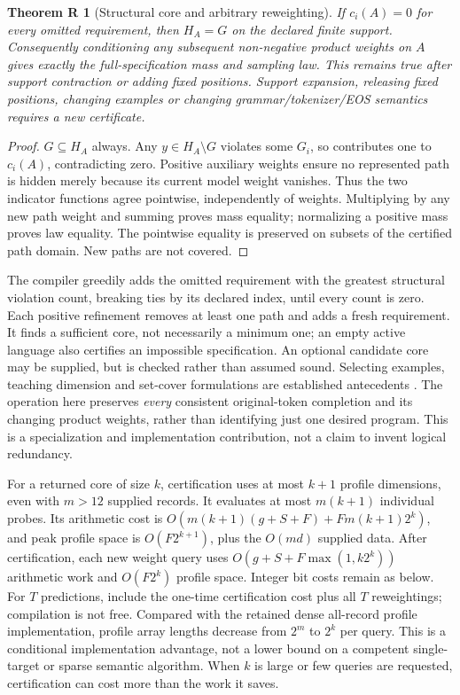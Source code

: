 \documentclass[11pt,a4paper]{article}
\newtheorem{refinement}{Theorem R}
\begin{document}
\begin{refinement}[Structural core and arbitrary reweighting]
If $c_i(A)=0$ for every omitted requirement, then $H_A=G$ on the declared
finite support. Consequently conditioning any subsequent non-negative product
weights on $A$ gives exactly the full-specification mass and sampling law.
This remains true after support contraction or adding fixed positions.
Support expansion, releasing fixed positions, changing examples or changing
grammar/tokenizer/EOS semantics requires a new certificate.
\end{refinement}
\begin{proof}
$G\subseteq H_A$ always. Any $y\in H_A\setminus G$ violates some $G_i$,
so contributes one to $c_i(A)$, contradicting zero. Positive auxiliary weights
ensure no represented path is hidden merely because its current model weight
vanishes. Thus the two indicator functions agree pointwise, independently of
weights. Multiplying by any new path weight and summing proves mass equality;
normalizing a positive mass proves law equality. The pointwise equality is
preserved on subsets of the certified path domain. New paths are not covered.
\end{proof}

The compiler greedily adds the omitted requirement with the greatest structural
violation count, breaking ties by its declared index, until every count is zero.
Each positive refinement removes at least one path and adds a fresh requirement.
It finds a sufficient core, not necessarily a minimum one; an empty active
language also certifies an impossible specification. An optional candidate core
may be supplied, but is checked rather than assumed sound. Selecting examples,
teaching dimension and set-cover formulations are established antecedents
\cite[Section 5]{jha2010oracle}. The operation here preserves \emph{every}
consistent original-token completion and its changing product weights, rather
than identifying just one desired program. This is a specialization and
implementation contribution, not a claim to invent logical redundancy.

For a returned core of size $k$, certification uses at most $k+1$ profile
dimensions, even with $m>12$ supplied records. It evaluates at most
$m(k+1)$ individual probes. Its arithmetic cost is
$O(m(k+1)(g+S+F)+Fm(k+1)2^k)$, and peak profile space is $O(F2^{k+1})$,
plus the $O(md)$ supplied data. After certification, each new weight query
uses $O(g+S+F\max(1,k2^k))$ arithmetic work and $O(F2^k)$ profile space.
Integer bit costs remain as below. For $T$ predictions, include the one-time
certification cost plus all $T$ reweightings; compilation is not free.
Compared with the retained dense all-record profile implementation, profile
array lengths decrease from $2^m$ to $2^k$ per query. This is a conditional
implementation advantage, not a lower bound on a competent single-target or
sparse semantic algorithm. When $k$ is large or few queries are requested,
certification can cost more than the work it saves.
\end{document}
